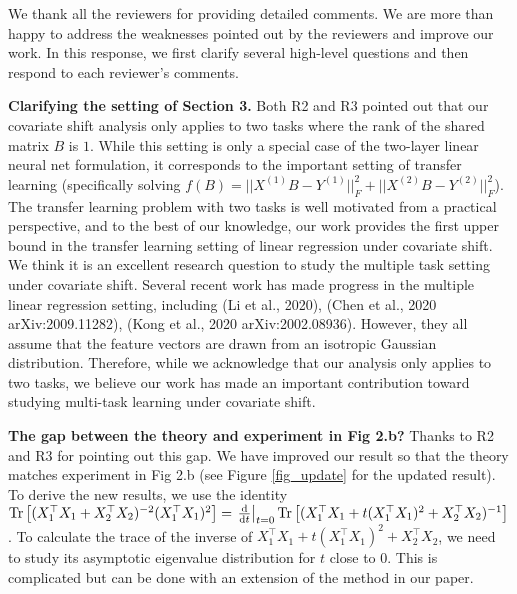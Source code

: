 \documentclass{article}
\begin{document}
	We thank all the reviewers for providing detailed comments.
	We are more than happy to address the weaknesses pointed out by the reviewers and improve our work.
	In this response, we first clarify several high-level questions and then respond to each reviewer's comments.

	\textbf{Clarifying the setting of Section 3.} Both R2 and R3 pointed out that our covariate shift analysis only applies to two tasks where the rank of the shared matrix $B$ is $1$.
	While this setting is only a special case of the two-layer linear neural net formulation, it corresponds to the important setting of transfer learning (specifically solving $f(B) = ||X^{(1)} B - Y^{(1)}||_F^2 + ||X^{(2)} B - Y^{(2)}||_F^2$).
	The transfer learning problem with two tasks is well motivated from a practical perspective, and to the best of our knowledge, our work provides the first upper bound in the transfer learning setting of linear regression under covariate shift.
	We think it is an excellent research question to study the multiple task setting under covariate shift.
	Several recent work has made progress in the multiple linear regression setting, including (Li et al., 2020), (Chen et al., 2020 arXiv:2009.11282), (Kong et al., 2020 arXiv:2002.08936).
	However, they all assume that the feature vectors are drawn from an isotropic Gaussian distribution.
	Therefore, while we acknowledge that our analysis only applies to two tasks, we believe our work has made an important contribution toward studying multi-task learning under covariate shift.

	\textbf{The gap between the theory and experiment in Fig 2.b?} Thanks to R2 and R3 for pointing out this gap.
	We have improved our result so that the theory matches experiment in Fig 2.b (see Figure \ref{fig_update} for the updated result).
	To derive the new results, we use the identity $\operatorname{Tr}\left[(X_1^\top X_1 + X_2^\top X_2)^{-2}(X_1^\top X_1)^2\right]= \left.\frac{\rm{d}}{{\rm d} t}\right|_{t=0} \operatorname{Tr}\left[(X_1^\top X_1 + t(X_1^\top X_1)^2 + X_2^\top X_2)^{-1}\right]$. To calculate the trace of the inverse of $X_1^\top X_1 + t(X_1^\top X_1)^2 + X_2^\top X_2$, we need to study its asymptotic eigenvalue distribution for $t$ close to 0. This is complicated but can be done with an extension of the method in our paper.  %
\end{document}
